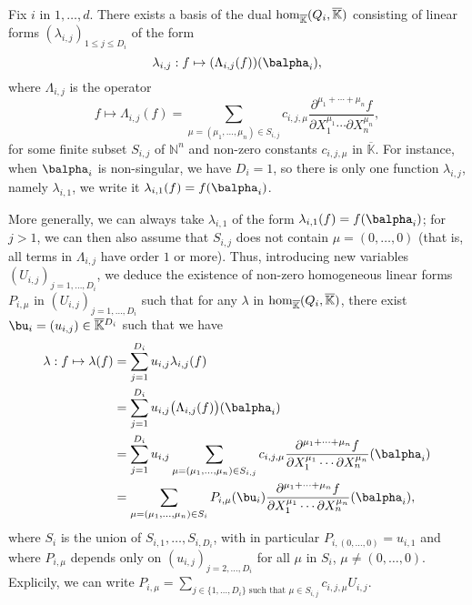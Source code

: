 \documentclass[12pt]{article}
\def\N {\ensuremath{\mathbb{N}}}
\def\Kbar {{\ensuremath{\overline{\mathbb{K}}}}}
\def\D {\ensuremath{D}}
\begin{document}
Fix $i$ in $1,\dots,d$.  There exists a basis of the dual ${\rm
	hom}_\Kbar(Q_i,\Kbar)$ consisting of linear forms
$(\lambda_{i,j})_{1\le j \le \D_i}$ of the form
$$\lambda_{i,j}: f \mapsto (\Lambda_{i,j}(f))(\balpha_i),$$
where $\Lambda_{i,j}$ is the operator
$$f \mapsto \Lambda_{i,j}(f) = \sum_{\mu=(\mu_1,\dots,\mu_n) \in
	S_{i,j}} c_{i,j,\mu} \frac{ \partial^{\mu_1 + \cdots + \mu_n} f}
{\partial X_1^{\mu_1} \cdots \partial X_n^{\mu_n}},$$ for some finite
subset $S_{i,j}$ of $\N^n$ and non-zero constants $c_{i,j,\mu}$ in
$\Kbar$. 
For instance, when $\balpha_i$ is non-singular, we have $D_i=1$, so
there is only one function $\lambda_{i,j}$, namely $\lambda_{i,1}$, we
write it $\lambda_{i,1}(f) = f(\balpha_i)$.

More generally, we can always take $\lambda_{i,1}$ of the form
$\lambda_{i,1}(f) = f(\balpha_i)$; for $j>1$, we can then also assume
that $S_{i,j}$ does not contain $\mu=(0,\dots,0)$ (that is, all terms
in $\Lambda_{i,j}$ have order $1$ or more). Thus, introducing new
variables $(U_{i,j})_{j =1,\dots,D_i}$, we deduce the existence of
non-zero homogeneous linear forms $P_{i,\mu}$ in
$(U_{i,j})_{j=1,\dots,D_i}$ such that for any $\lambda$ in ${\rm
	hom}_\Kbar(Q_i,\Kbar)$, there exist $\bu_i=(u_{i,j}) \in
\Kbar{}^{D_i}$ such that we have
\begin{align}\label{ell_param}
\lambda: f \mapsto \lambda(f)
&= \sum_{j=1}^{D_i} u_{i,j} \lambda_{i,j}(f)\nonumber\\
&= \sum_{j=1}^{D_i} u_{i,j} \big(\Lambda_{i,j}(f)\big)(\balpha_i)\nonumber\\
&= \sum_{j=1}^{D_i} u_{i,j}
\sum_{\mu=(\mu_1,\dots,\mu_n) \in
	S_{i,j}} c_{i,j,\mu} \frac{ \partial^{\mu_1 + \cdots + \mu_n} f}
{\partial X_1^{\mu_1} \cdots \partial X_n^{\mu_n}}(\balpha_i)\nonumber\\
&= \sum_{\mu=(\mu_1,\dots,\mu_n) \in S_i} P_{i,\mu}(\bu_i)
\frac{ \partial^{\mu_1 + \cdots + \mu_n} f}
{\partial X_1^{\mu_1} \cdots \partial X_n^{\mu_n}}(\balpha_i),
\end{align}
where $S_i$ is  the union of $S_{i,1},\dots,S_{i,D_i}$,
with in particular $P_{i,(0,\dots,0)}=u_{i,1}$ and where $P_{i,\mu}$
depends only on $(u_{i,j})_{j =2,\dots,D_i}$ for all $\mu$ in $S_i$,
$\mu \ne (0,\dots,0)$. Explicily, we can write $P_{i,\mu}=\sum_{j\in
	\{1,\dots,D_i\} \text{~such that~} \mu \in S_{i,j}} c_{i,j,\mu}
U_{i,j}$.
\end{document}
